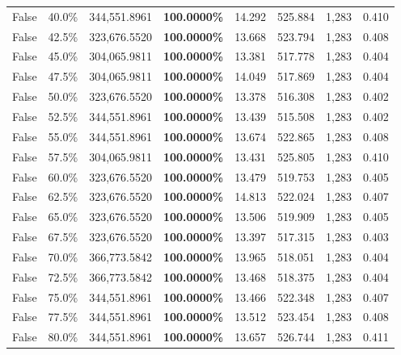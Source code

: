\begin{table}[H]
\begin{tabular}{lllrllll}
\cline{1-8}
False & 40.0\% & 344,551.8961 & \bfseries \color{red} 100.0000\% & 14.292 & 525.884 & 1,283 & 0.410 \\
\cline{1-8}
False & 42.5\% & 323,676.5520 & \bfseries \color{red} 100.0000\% & 13.668 & 523.794 & 1,283 & 0.408 \\
\cline{1-8}
False & 45.0\% & \color{red} 304,065.9811 & \bfseries \color{red} 100.0000\% & 13.381 & 517.778 & 1,283 & 0.404 \\
\cline{1-8}
False & 47.5\% & \color{red} 304,065.9811 & \bfseries \color{red} 100.0000\% & 14.049 & 517.869 & 1,283 & 0.404 \\
\cline{1-8}
False & 50.0\% & 323,676.5520 & \bfseries \color{red} 100.0000\% & 13.378 & 516.308 & 1,283 & 0.402 \\
\cline{1-8}
False & 52.5\% & 344,551.8961 & \bfseries \color{red} 100.0000\% & 13.439 & 515.508 & 1,283 & 0.402 \\
\cline{1-8}
False & 55.0\% & 344,551.8961 & \bfseries \color{red} 100.0000\% & 13.674 & 522.865 & 1,283 & 0.408 \\
\cline{1-8}
False & 57.5\% & \color{red} 304,065.9811 & \bfseries \color{red} 100.0000\% & 13.431 & 525.805 & 1,283 & 0.410 \\
\cline{1-8}
False & 60.0\% & 323,676.5520 & \bfseries \color{red} 100.0000\% & 13.479 & 519.753 & 1,283 & 0.405 \\
\cline{1-8}
False & 62.5\% & 323,676.5520 & \bfseries \color{red} 100.0000\% & 14.813 & 522.024 & 1,283 & 0.407 \\
\cline{1-8}
False & 65.0\% & 323,676.5520 & \bfseries \color{red} 100.0000\% & 13.506 & 519.909 & 1,283 & 0.405 \\
\cline{1-8}
False & 67.5\% & 323,676.5520 & \bfseries \color{red} 100.0000\% & 13.397 & 517.315 & 1,283 & 0.403 \\
\cline{1-8}
False & 70.0\% & 366,773.5842 & \bfseries \color{red} 100.0000\% & 13.965 & 518.051 & 1,283 & 0.404 \\
\cline{1-8}
False & 72.5\% & 366,773.5842 & \bfseries \color{red} 100.0000\% & 13.468 & 518.375 & 1,283 & 0.404 \\
\cline{1-8}
False & 75.0\% & 344,551.8961 & \bfseries \color{red} 100.0000\% & 13.466 & 522.348 & 1,283 & 0.407 \\
\cline{1-8}
False & 77.5\% & 344,551.8961 & \bfseries \color{red} 100.0000\% & 13.512 & 523.454 & 1,283 & 0.408 \\
\cline{1-8}
False & 80.0\% & 344,551.8961 & \bfseries \color{red} 100.0000\% & 13.657 & 526.744 & 1,283 & 0.411 \\

\end{tabular}
\end{table}
